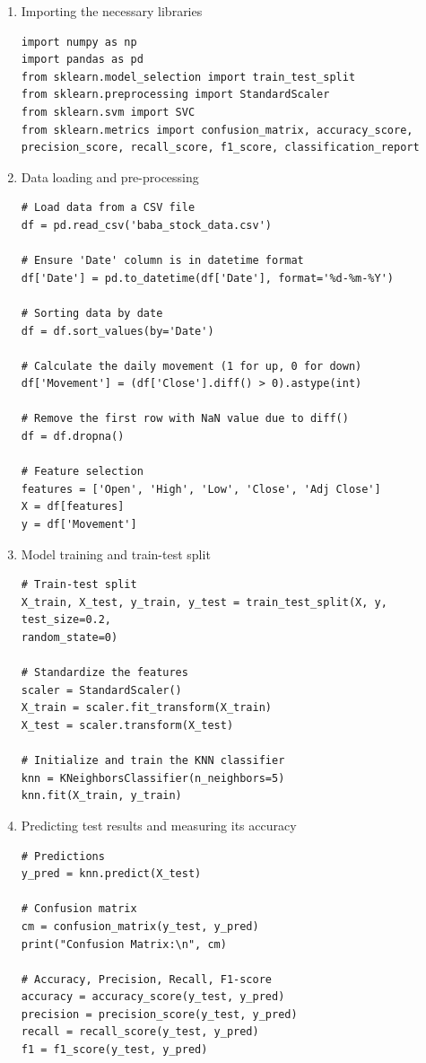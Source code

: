 \documentclass[12pt,a4paper]{report}
\begin{document}
\begin{enumerate}
        \item Importing the necessary libraries
        \begin{verbatim}
import numpy as np
import pandas as pd
from sklearn.model_selection import train_test_split
from sklearn.preprocessing import StandardScaler
from sklearn.svm import SVC
from sklearn.metrics import confusion_matrix, accuracy_score, 
precision_score, recall_score, f1_score, classification_report
       \end{verbatim}
       \newpage
       \item Data loading and pre-processing 
       \begin{verbatim}
# Load data from a CSV file
df = pd.read_csv('baba_stock_data.csv')

# Ensure 'Date' column is in datetime format
df['Date'] = pd.to_datetime(df['Date'], format='%d-%m-%Y')

# Sorting data by date
df = df.sort_values(by='Date')

# Calculate the daily movement (1 for up, 0 for down)
df['Movement'] = (df['Close'].diff() > 0).astype(int)

# Remove the first row with NaN value due to diff()
df = df.dropna()

# Feature selection
features = ['Open', 'High', 'Low', 'Close', 'Adj Close']
X = df[features]
y = df['Movement']

\end{verbatim}
     \item Model training and train-test split 
     \begin{verbatim}
# Train-test split
X_train, X_test, y_train, y_test = train_test_split(X, y, test_size=0.2, 
random_state=0)

# Standardize the features
scaler = StandardScaler()
X_train = scaler.fit_transform(X_train)
X_test = scaler.transform(X_test)

# Initialize and train the KNN classifier
knn = KNeighborsClassifier(n_neighbors=5)
knn.fit(X_train, y_train)
 \end{verbatim}
    \item Predicting test results and measuring its accuracy
 \begin{verbatim}
# Predictions
y_pred = knn.predict(X_test)

# Confusion matrix
cm = confusion_matrix(y_test, y_pred)
print("Confusion Matrix:\n", cm)

# Accuracy, Precision, Recall, F1-score
accuracy = accuracy_score(y_test, y_pred)
precision = precision_score(y_test, y_pred)
recall = recall_score(y_test, y_pred)
f1 = f1_score(y_test, y_pred)


\end{verbatim}
\end{enumerate}
\end{document}
